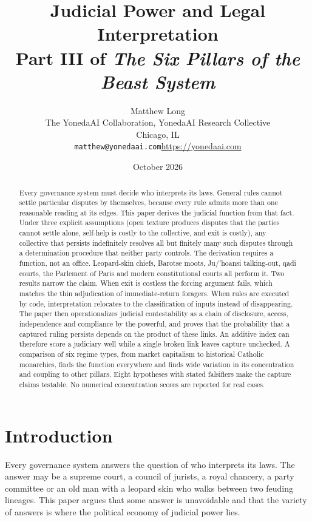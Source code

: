 \documentclass[11pt,letterpaper]{article}
\title{Judicial Power and Legal Interpretation\\[4pt]
  {\normalsize Part III of \emph{The Six Pillars of the Beast System}}}
\author{Matthew Long\\
  \small The YonedaAI Collaboration, YonedaAI Research Collective\\
  \small Chicago, IL\\
  \small \texttt{matthew@yonedaai.com}\quad \url{https://yonedaai.com}}
\date{October 2026}
\theoremstyle{definition}
\theoremstyle{remark}
\begin{document}
\maketitle

\begin{abstract}
Every governance system must decide who interprets its laws. General rules cannot settle particular disputes by themselves, because every rule admits more than one reasonable reading at its edges. This paper derives the judicial function from that fact. Under three explicit assumptions (open texture produces disputes that the parties cannot settle alone, self-help is costly to the collective, and exit is costly), any collective that persists indefinitely resolves all but finitely many such disputes through a determination procedure that neither party controls. The derivation requires a function, not an office. Leopard-skin chiefs, Barotse moots, Ju/'hoansi talking-out, qadi courts, the Parlement of Paris and modern constitutional courts all perform it. Two results narrow the claim. When exit is costless the forcing argument fails, which matches the thin adjudication of immediate-return foragers. When rules are executed by code, interpretation relocates to the classification of inputs instead of disappearing. The paper then operationalizes judicial contestability as a chain of disclosure, access, independence and compliance by the powerful, and proves that the probability that a captured ruling persists depends on the product of these links. An additive index can therefore score a judiciary well while a single broken link leaves capture unchecked. A comparison of six regime types, from market capitalism to historical Catholic monarchies, finds the function everywhere and finds wide variation in its concentration and coupling to other pillars. Eight hypotheses with stated falsifiers make the capture claims testable. No numerical concentration scores are reported for real cases.
\end{abstract}

\section{Introduction}

Every governance system answers the question of who interprets its laws. The answer may be a supreme court, a council of jurists, a royal chancery, a party committee or an old man with a leopard skin who walks between two feuding lineages. This paper argues that some answer is unavoidable and that the variety of answers is where the political economy of judicial power lies.
\end{document}
